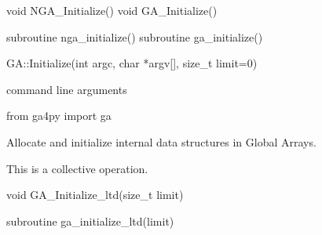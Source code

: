 \documentclass[12pt]{article}
\begin{document}

\begin{capi}
\begin{ccode}
void NGA_Initialize()
void GA_Initialize()
\end{ccode}
\end{capi}

\begin{fapi}
\begin{fcode}
subroutine nga_initialize()
subroutine ga_initialize()
\end{fcode}
\end{fapi}

\begin{cxxapi}
\begin{cxxcode}
GA::Initialize(int argc, char *argv[], size_t limit=0)
\end{cxxcode}
\begin{funcargs}
 {command line arguments}
\end{funcargs}
\end{cxxapi}

\begin{pyapi}
\begin{pycode}
from ga4py import ga
\end{pycode}
\end{pyapi}

\gcoll

\begin{desc}

Allocate and initialize internal data structures in Global Arrays.

This is a collective operation.

\end{desc}


\begin{capi}
\begin{ccode}
void GA_Initialize_ltd(size_t limit)
\end{ccode}
\begin{funcargs}
\end{funcargs}
\end{capi}

\begin{fapi}
\begin{fcode}
subroutine ga_initialize_ltd(limit)
\end{fcode}
\begin{funcargs}
\end{funcargs}
\end{fapi}
\end{document}
